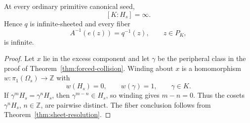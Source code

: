 \begin{theorem}\label{thm:infinite-sheet-defect}
At every ordinary primitive canonical seed,
\[
[K:H_s]=\infty .
\]
Hence \(q\) is infinite-sheeted and every fiber
\[
A^{-1}(e(z))=q^{-1}(z),\qquad z\in P_K,
\]
is infinite.
\end{theorem}

\begin{proof}
Let \(x\) lie in the excess component and let \(\gamma\) be the peripheral class in the proof of Theorem~\ref{thm:forced-collision}. Winding about \(x\) is a homomorphism \(w:\pi_1(\Omega_s)\to\mathbb Z\) with
\[
w(H_s)=0,\qquad w(\gamma)=1,\qquad \gamma\in K .
\]
If \(\gamma^{m}H_s=\gamma^{n}H_s\), then \(\gamma^{m-n}\in H_s\), so winding gives \(m-n=0\). Thus the cosets \(\gamma^{n}H_s\), \(n\in\mathbb Z\), are pairwise distinct. The fiber conclusion follows from Theorem~\ref{thm:sheet-resolution}.
\end{proof}